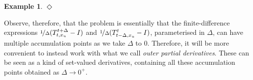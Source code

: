 \documentclass[10pt,a4paper]{paper}
\theoremstyle{definition}
\newtheorem{exmp}{Example}%
\newcommand{\nats}{\mathbb{N}}
\newcommand{\reals}{\mathbb{R}}
\newcommand{\realspos}{\reals_{>0}}
\newcommand{\realsnonneg}{\reals_{\geq 0}}
\newcommand{\states}{\mathcal{X}}
\newcommand{\processes}{\mathbb{P}}
\newcommand{\wprocesses}{\processes^{\mathrm{W}}}
\newcommand{\wmprocesses}{\processes^{\mathrm{WM}}}
\newcommand{\norm}[1]{\left\lVert #1 \right\rVert}
\newcommand{\coloneqq}{:\!=}
\newcommand{\exampleend}{\hfill$\Diamond$}
\begin{document}
\begin{exmp}
%
%
\exampleend
\end{exmp}

Observe, therefore, that the problem is essentially that the finite-difference expressions $\nicefrac{1}{\Delta}(T_{t,x_u}^{t+\Delta} - I)$ and $\nicefrac{1}{\Delta}(T_{t-\Delta,x_u}^{t} - I)$, parameterised in $\Delta$, can have multiple accumulation points as we take $\Delta$ to $0$. Therefore, it will be more convenient to instead work with what we call \emph{outer partial derivatives}. These can be seen as a kind of set-valued derivatives, containing all these accumulation points obtained as $\Delta\to0^+$.
\end{document}
